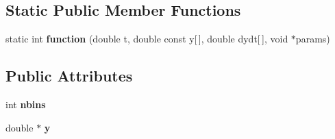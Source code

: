 \subsection*{Static Public Member Functions}
\begin{DoxyCompactItemize}
\item 
\hypertarget{classstudy_1_1_diff_eq___sim_a28c2c0c2fb1c8f9f62ac80fd06adca6a}{static int {\bfseries function} (double t, double const y\mbox{[}$\,$\mbox{]}, double dydt\mbox{[}$\,$\mbox{]}, void $\ast$params)}\label{classstudy_1_1_diff_eq___sim_a28c2c0c2fb1c8f9f62ac80fd06adca6a}

\end{DoxyCompactItemize}
\subsection*{Public Attributes}
\begin{DoxyCompactItemize}
\item 
\hypertarget{classstudy_1_1_diff_eq___sim_afd201e0d3089685661d14e14ed7c8549}{int {\bfseries nbins}}\label{classstudy_1_1_diff_eq___sim_afd201e0d3089685661d14e14ed7c8549}

\item 
\hypertarget{classstudy_1_1_diff_eq___sim_a34777d09bde843e1b402d5d9bf77944a}{double $\ast$ {\bfseries y}}\label{classstudy_1_1_diff_eq___sim_a34777d09bde843e1b402d5d9bf77944a}

\end{DoxyCompactItemize}
